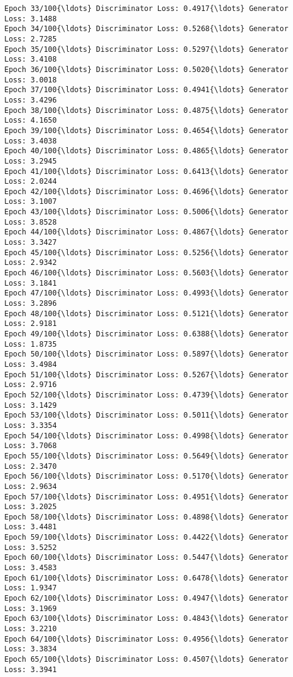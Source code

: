 \documentclass[11pt]{article}
\begin{document}
\begin{Verbatim}[commandchars=\\\{\}]
Epoch 33/100{\ldots} Discriminator Loss: 0.4917{\ldots} Generator Loss: 3.1488
Epoch 34/100{\ldots} Discriminator Loss: 0.5268{\ldots} Generator Loss: 2.7285
Epoch 35/100{\ldots} Discriminator Loss: 0.5297{\ldots} Generator Loss: 3.4108
Epoch 36/100{\ldots} Discriminator Loss: 0.5020{\ldots} Generator Loss: 3.0018
Epoch 37/100{\ldots} Discriminator Loss: 0.4941{\ldots} Generator Loss: 3.4296
Epoch 38/100{\ldots} Discriminator Loss: 0.4875{\ldots} Generator Loss: 4.1650
Epoch 39/100{\ldots} Discriminator Loss: 0.4654{\ldots} Generator Loss: 3.4038
Epoch 40/100{\ldots} Discriminator Loss: 0.4865{\ldots} Generator Loss: 3.2945
Epoch 41/100{\ldots} Discriminator Loss: 0.6413{\ldots} Generator Loss: 2.0244
Epoch 42/100{\ldots} Discriminator Loss: 0.4696{\ldots} Generator Loss: 3.1007
Epoch 43/100{\ldots} Discriminator Loss: 0.5006{\ldots} Generator Loss: 3.8528
Epoch 44/100{\ldots} Discriminator Loss: 0.4867{\ldots} Generator Loss: 3.3427
Epoch 45/100{\ldots} Discriminator Loss: 0.5256{\ldots} Generator Loss: 2.9342
Epoch 46/100{\ldots} Discriminator Loss: 0.5603{\ldots} Generator Loss: 3.1841
Epoch 47/100{\ldots} Discriminator Loss: 0.4993{\ldots} Generator Loss: 3.2896
Epoch 48/100{\ldots} Discriminator Loss: 0.5121{\ldots} Generator Loss: 2.9181
Epoch 49/100{\ldots} Discriminator Loss: 0.6388{\ldots} Generator Loss: 1.8735
Epoch 50/100{\ldots} Discriminator Loss: 0.5897{\ldots} Generator Loss: 3.4984
Epoch 51/100{\ldots} Discriminator Loss: 0.5267{\ldots} Generator Loss: 2.9716
Epoch 52/100{\ldots} Discriminator Loss: 0.4739{\ldots} Generator Loss: 3.1429
Epoch 53/100{\ldots} Discriminator Loss: 0.5011{\ldots} Generator Loss: 3.3354
Epoch 54/100{\ldots} Discriminator Loss: 0.4998{\ldots} Generator Loss: 3.7068
Epoch 55/100{\ldots} Discriminator Loss: 0.5649{\ldots} Generator Loss: 2.3470
Epoch 56/100{\ldots} Discriminator Loss: 0.5170{\ldots} Generator Loss: 2.9634
Epoch 57/100{\ldots} Discriminator Loss: 0.4951{\ldots} Generator Loss: 3.2025
Epoch 58/100{\ldots} Discriminator Loss: 0.4898{\ldots} Generator Loss: 3.4481
Epoch 59/100{\ldots} Discriminator Loss: 0.4422{\ldots} Generator Loss: 3.5252
Epoch 60/100{\ldots} Discriminator Loss: 0.5447{\ldots} Generator Loss: 3.4583
Epoch 61/100{\ldots} Discriminator Loss: 0.6478{\ldots} Generator Loss: 1.9347
Epoch 62/100{\ldots} Discriminator Loss: 0.4947{\ldots} Generator Loss: 3.1969
Epoch 63/100{\ldots} Discriminator Loss: 0.4843{\ldots} Generator Loss: 3.2210
Epoch 64/100{\ldots} Discriminator Loss: 0.4956{\ldots} Generator Loss: 3.3834
Epoch 65/100{\ldots} Discriminator Loss: 0.4507{\ldots} Generator Loss: 3.3941

\end{Verbatim}
\end{document}
